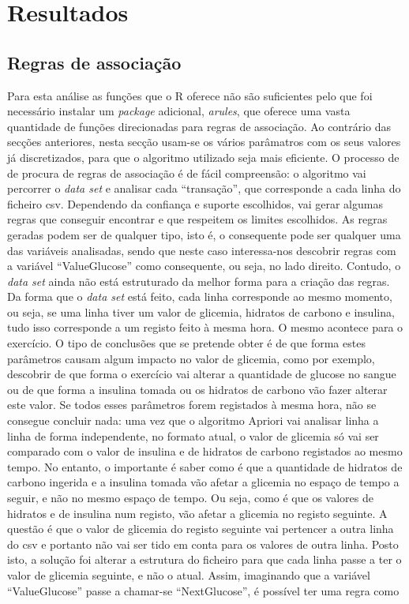 \chapter{Resultados}\label{chap:results}

\section{Regras de associação}

Para esta análise as funções que o R oferece não são suficientes pelo que foi necessário instalar um \textit{package} adicional, \textit{arules}, que oferece uma vasta quantidade de funções direcionadas para regras de associação. Ao contrário das secções anteriores, nesta secção usam-se os vários parâmatros com os seus valores já discretizados, para que o algoritmo utilizado seja mais eficiente. O processo de de procura de regras de associação é de fácil compreensão: o algoritmo vai percorrer o \textit{data set} e analisar cada ``transação'', que corresponde a cada linha do ficheiro csv. Dependendo da confiança e suporte escolhidos, vai gerar algumas regras que conseguir encontrar e que respeitem os limites escolhidos. As regras geradas podem ser de qualquer tipo, isto é, o consequente pode ser qualquer uma das variáveis analisadas, sendo que neste caso interessa-nos descobrir regras com a variável ``Value\textunderscore Glucose'' como consequente, ou seja, no lado direito. Contudo, o \textit{data set} ainda não está estruturado da melhor forma para a criação das regras. 
Da forma que o \textit{data set} está feito, cada linha corresponde ao mesmo momento, ou seja, se uma linha tiver um valor de glicemia, hidratos de carbono e insulina, tudo isso corresponde a um registo feito à mesma hora. O mesmo acontece para o exercício. O tipo de conclusões que se pretende obter é de que forma estes parâmetros causam algum impacto no valor de glicemia, como por exemplo, descobrir de que forma o exercício vai alterar a quantidade de glucose no sangue ou de que forma a insulina tomada ou os hidratos de carbono vão fazer alterar este valor. Se todos esses parâmetros forem registados à mesma hora, não se consegue concluir nada: uma vez que o algoritmo Apriori vai analisar linha a linha de forma independente, no formato atual, o valor de glicemia só vai ser comparado com o valor de insulina e de hidratos de carbono registados ao mesmo tempo. No entanto, o importante é saber como é que a quantidade de hidratos de carbono ingerida e a insulina tomada vão afetar a glicemia no espaço de tempo a seguir, e não no mesmo espaço de tempo. Ou seja, como é que os valores de hidratos e de insulina num registo, vão afetar a glicemia no registo seguinte. A questão é que o valor de glicemia do registo seguinte vai pertencer a outra linha do csv e portanto não vai ser tido em conta para os valores de outra linha. Posto isto, a solução foi alterar a estrutura do ficheiro para que cada linha passe a ter o valor de glicemia seguinte, e não o atual. Assim, imaginando que a variável ``Value\textunderscore Glucose'' passe a chamar-se ``Next\textunderscore Glucose'', é possível ter uma regra como

